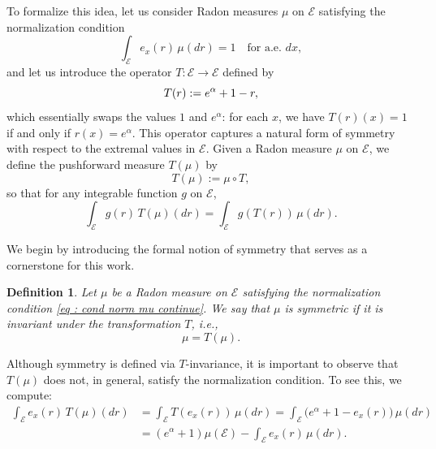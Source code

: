 \documentclass[a4paper, 11pt]{article}
\newtheorem{df}{Definition}
\theoremstyle{definition}
\begin{document}
{To formalize this idea, let us consider Radon measures $\mu$ on $\mathcal{E}$ satisfying the normalization condition
\[
\int_\mathcal{E} e_x(r)\, \mu(dr) = 1 \quad \text{for a.e.\ } dx,
\]
and let us introduce the operator $T: \mathcal{E} \to \mathcal{E}$ defined by
\begin{equation}{\label{eq: def T sym}}
 T(r) := e^\alpha + 1 - r,   
\end{equation}
which essentially swaps the values $1$ and $e^\alpha$: for each $x$, we have $T(r)(x) = 1$ if and only if $r(x) = e^\alpha$. This operator captures a natural form of symmetry with respect to the extremal values in $\mathcal{E}$. Given a Radon measure $\mu$ on $\mathcal{E}$, we define the pushforward measure $T(\mu)$ by
\[
T(\mu) := \mu \circ T,
\]
so that for any integrable function $g$ on $\mathcal{E}$,
\[
\int_\mathcal{E} g(r)\, T(\mu)(dr) = \int_\mathcal{E} g(T(r))\, \mu(dr).
\]
{We begin by introducing the formal notion of symmetry that serves as a cornerstone for this work.
\begin{df}\label{def: sym mu}
Let $\mu$ be a Radon measure on $\mathcal{E}$ satisfying the normalization condition \eqref{eq : cond norm mu continue}. We say that $\mu$ is symmetric if it is invariant under the transformation $T$, i.e.,
\[
\mu = T(\mu).
\]
\end{df}
Although symmetry is defined via $T$-invariance, it is important to observe that $T(\mu)$ does not, in general, satisfy the normalization condition. To see this, we compute:
\begin{align*}
\int_\mathcal{E} e_x(r)\, T(\mu)(dr) 
&= \int_\mathcal{E} T(e_x(r))\, \mu(dr) 
= \int_\mathcal{E} \big(e^\alpha + 1 - e_x(r)\big)\, \mu(dr) \\
&= (e^\alpha + 1)\mu(\mathcal{E}) - \int_\mathcal{E} e_x(r)\, \mu(dr) .
\end{align*}
}}
\end{document}
